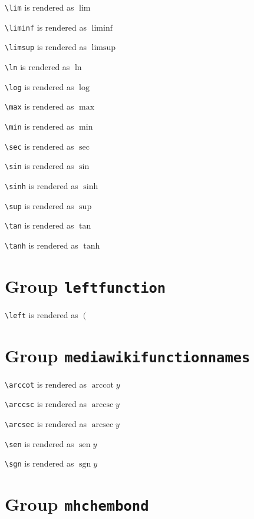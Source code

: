 \texttt{\textbackslash lim} is rendered as $\lim$

\texttt{\textbackslash liminf} is rendered as $\liminf$

\texttt{\textbackslash limsup} is rendered as $\limsup$

\texttt{\textbackslash ln} is rendered as $\ln$

\texttt{\textbackslash log} is rendered as $\log$

\texttt{\textbackslash max} is rendered as $\max$

\texttt{\textbackslash min} is rendered as $\min$

\texttt{\textbackslash sec} is rendered as $\sec$

\texttt{\textbackslash sin} is rendered as $\sin$

\texttt{\textbackslash sinh} is rendered as $\sinh$

\texttt{\textbackslash sup} is rendered as $\sup$

\texttt{\textbackslash tan} is rendered as $\tan$

\texttt{\textbackslash tanh} is rendered as $\tanh$

\section{ Group \texttt{left\textunderscore function}}

\texttt{\textbackslash left} is rendered as $\left( \right.$

\section{ Group \texttt{mediawiki\textunderscore function\textunderscore names}}

\texttt{\textbackslash arccot} is rendered as $\operatorname{arccot} y$

\texttt{\textbackslash arccsc} is rendered as $\operatorname{arccsc} y$

\texttt{\textbackslash arcsec} is rendered as $\operatorname{arcsec} y$

\texttt{\textbackslash sen} is rendered as $\operatorname{sen} y$

\texttt{\textbackslash sgn} is rendered as $\operatorname{sgn} y$

\section{ Group \texttt{mhchem\textunderscore bond}}


